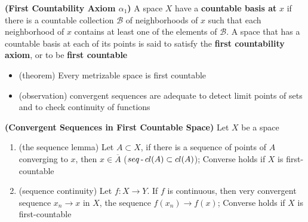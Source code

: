 \documentclass[10.5pt]{article}
\newcommand{\calB}{\mathcal{B}}
\DeclareMathOperator{\mdash}{{\hbox{-}}}
\begin{document}
\begin{defn*}
    \textbf{(First Countability Axiom $\alpha_1$)} A space $X$ have a \textbf{countable basis at} $x$ if there is a countable collection $\calB$ of neighborhoods of $x$ such that each neighborhood of $x$ contains at least one of the elements of $\calB$. A space that has a countable basis at each of its points is said to satisfy the \textbf{first countability axiom}, or to be \textbf{first countable}
    \begin{itemize}
        \item (theorem) Every metrizable space is first countable
        \item (observation) convergent sequences are adequate to detect limit points of sets and to check continuity of functions
    \end{itemize}
\end{defn*}


\begin{theorem*}
    \textbf{(Convergent Sequences in First Countable Space)} Let $X$ be a space
    \begin{enumerate}
        \item (the sequence lemma) Let $A\subset X$, if there is a sequence of points of $A$ converging to $x$, then $x\in \overline{A}$ ($seq\mdash cl(A)\subset cl(A)$); Converse holds if $X$ is first-countable
        \item (sequence continuity) Let $f:X\to Y$. If $f$ is continuous, then very convergent sequence $x_n \to x$ in $X$, the sequence $f(x_n) \to f(x)$; Converse holds if $X$ is first-countable
    \end{enumerate}
\end{theorem*}
\end{document}
